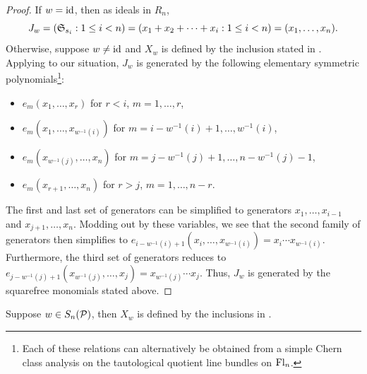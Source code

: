 \begin{proof}
    If $w=\mathrm{id}$, then as ideals in $R_n$,
    \[
    J_w = (\mathfrak{S}_{s_i}:1\leq i<n) = (x_1+x_2+\cdots + x_i:1\leq i<n)= (x_1,\dots, x_n).
    \]
    Otherwise, suppose $w\neq \mathrm{id}$ and $X_w$ is defined by the inclusion stated in . Applying  to our situation, $J_w$ is generated by the following elementary symmetric polynomials\footnote{Each of these relations can alternatively be obtained from a simple Chern class analysis on the tautological quotient line bundles on $\mathrm{Fl}_n$.}:
    \begin{itemize}
        \item $e_m(x_1,\dots, x_r)$ for $r<i$, $m = 1,\dots, r$,
        \item $e_m(x_1,\dots, x_{w^{-1}(i)})$ for $m=i-w^{-1}(i)+1,\dots, w^{-1}(i)$,
        \item $e_m(x_{w^{-1}(j)},\dots, x_n)$ for $m = j-w^{-1}(j)+1,\dots, n-w^{-1}(j)-1$,
        \item $e_m(x_{r+1},\dots, x_n)$ for $r>j$, $m=1,\dots, n-r$.
    \end{itemize}
    The first and last set of generators can be simplified to generators $x_1,\dots, x_{i-1}$ and $x_{j+1},\dots, x_n$. Modding out by these variables, we see that the second family of generators then simplifies to $e_{i-w^{-1}(i)+1}(x_i,\dots, x_{w^{-1}(i)}) = x_i\cdots x_{w^{-1}(i)}$. Furthermore, the third set of generators reduces to $e_{j-w^{-1}(j)+1}(x_{w^{-1}(j)},\dots, x_j) = x_{w^{-1}(j)}\cdots x_j$. 
    Thus, $J_w$ is generated by the squarefree monomials stated above.
\end{proof}





\begin{lemma}\label{lem:2implies3}
\label{lem: A2 implies A3}
    Suppose $w\in S_n(\mathcal{P})$, then $X_w$ is defined by the inclusions in .
\end{lemma}

